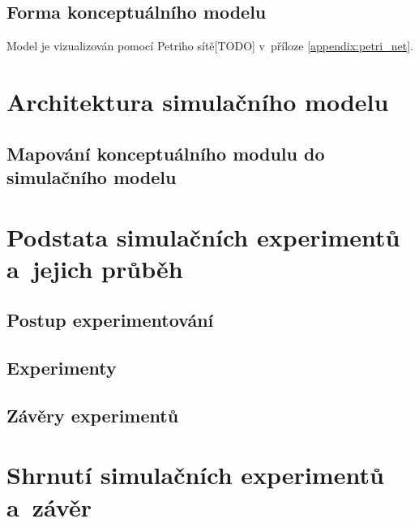 \documentclass[a4paper, 11pt]{article}
\begin{document}
	\subsection{Forma konceptuálního modelu}

	Model je vizualizován pomocí Petriho sítě[TODO] v~příloze
	\ref{appendix:petri_net}.



	\section{Architektura simulačního modelu}


	\subsection{Mapování konceptuálního modulu do simulačního modelu}



	\section{Podstata simulačních experimentů a~jejich průběh}


	\subsection{Postup experimentování}


	\subsection{Experimenty}


	\subsection{Závěry experimentů}



	\section{Shrnutí simulačních experimentů a~závěr}



	\clearpage
	
	\renewcommand{\refname}{Literatura}
	
\end{document}
